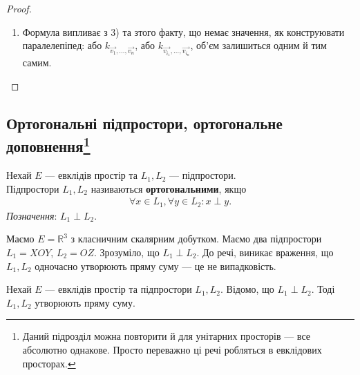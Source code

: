 \documentclass{math_library}
\begin{document}
\begin{proof}
\begin{enumerate}[topsep=0pt, wide=0pt, label={\arabic*)}]
\begin{enumerate}[nosep,wide=0pt,label={\Roman*.}]
\[
h = \sqrt{\dfrac{\det(\Gamma[\vec{v}_1,\dots,\vec{v}_n,\vec{v}_{n+1}])}{\det(\Gamma[\vec{v}_1,\dots,\vec{v}_n])}}.
\]
Із іншого боку, $k_{\vec{v}_1,\dots,\vec{v}_n,\vec{v}_{n+1}} = h \cdot k_{\vec{v}_1,\dots,\vec{v}_n}$. За припущенням МІ, 
\[
k_{\vec{v}_1,\dots,\vec{v}_n} = \sqrt{\det(\Gamma[\vec{v}_1,\dots,\vec{v}_n])}.
\]
Також сюди ми підставимо висоту $h$, звідси
\[
k_{\vec{v}_1,\dots,\vec{v}_n,\vec{v}_{n+1}} = \sqrt{\dfrac{\det(\Gamma[\vec{v}_1,\dots,\vec{v}_n,\vec{v}_{n+1}])}{\det(\Gamma[\vec{v}_1,\dots,\vec{v}_n])}} \cdot \sqrt{\det(\Gamma[\vec{v}_1,\dots,\vec{v}_n])} = \sqrt{\det(\Gamma[\vec{v}_1,\dots,\vec{v}_n, \vec{v}_{n+1}])}.
\]
\end{enumerate}
МІ доведено.
\item Формула випливає з 3) та зтого факту, що немає значення, як конструювати паралелепіпед: або $k_{\vec{v_1},\dots,\vec{v_n}}$, або $k_{\vec{v_{i_1}},\dots,\vec{v_{i_n}}}$, об'єм залишиться одним й тим самим. \qedhere
\end{enumerate}
\end{proof}

\subsection{Ортогональні підпростори, ортогональне доповнення\footnote{Даний підрозділ можна повторити й для унітарних просторів --- все абсолютно однакове. Просто переважно ці речі робляться в евклідових просторах.}}
\begin{definition}
Нехай $E$ --- евклідів простір та $L_1,L_2$ --- підпростори.\\
Підпростори $L_1,L_2$ називаються \textbf{ортогональними}, якщо
\begin{align*}
\forall x \in L_1, \forall y \in L_2: x \perp y.
\end{align*}
\textit{Позначення}: $L_1 \perp L_2$.
\end{definition}

\begin{example}
Маємо $E = \mathbb{R}^3$  з класничним скалярним добутком. Маємо два підпростори $L_1 = XOY$, $L_2 = OZ$. Зрозуміло, що $L_1 \perp L_2$. До речі, виникає враження, що $L_1,L_2$ одночасно утворюють пряму суму --- це не випадковість.
\end{example}

\begin{proposition}
Нехай $E$ --- евклідів простір та підпростори $L_1,L_2$. Відомо, що $L_1 \perp L_2$. Тоді $L_1, L_2$ утворюють пряму суму.
\end{proposition}
\end{document}
